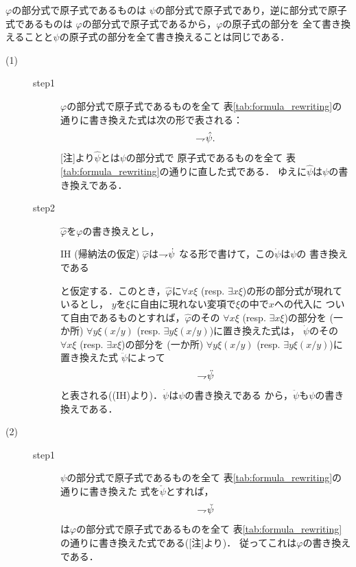 	\begin{metaprf}
		[注] $\varphi$の部分式で原子式であるものは
		$\psi$の部分式で原子式であり，逆に部分式で原子式であるものは
		$\varphi$の部分式で原子式であるから，$\varphi$の原子式の部分を
		全て書き換えることと$\psi$の原子式の部分を全て書き換えることは同じである．
		\begin{description}
			\item[(1)] 
				\begin{description}
					\item[step1]
						$\varphi$の部分式で原子式であるものを全て
						表\ref{tab:formula_rewriting}の通りに書き換えた式は次の形で表される：
						\begin{align}
							\rightharpoondown\hspace{-0.25em} \hat{\psi}.
						\end{align}
						[注]より$\hat{\psi}$とは$\psi$の部分式で
						原子式であるものを全て
						表\ref{tab:formula_rewriting}の通りに直した式である．
						ゆえに$\hat{\psi}$は$\psi$の書き換えである．
						
					\item[step2]
						$\widehat{\varphi}$を$\varphi$の書き換えとし，
						\begin{itembox}[l]{IH (帰納法の仮定)}
							$\widehat{\varphi}$は$\rightharpoondown\hspace{-0.25em} \dot{\psi}$
							なる形で書けて，この$\dot{\psi}$は$\psi$の
							書き換えである
						\end{itembox}
						と仮定する．このとき，$\widehat{\varphi}$に$\forall x \xi$ 
						(resp. $\exists x \xi$)の形の部分式が現れているとし，
						$y$を$\xi$に自由に現れない変項で$\xi$の中で$x$への代入に
						ついて自由であるものとすれば，$\widehat{\varphi}$のその
						$\forall x \xi$ (resp. $\exists x \xi$)の部分を
						(一か所) $\forall y \xi(x/y)$
						(resp. $\exists y \xi(x/y)$)に置き換えた式は，
						$\dot{\psi}$のその$\forall x \xi$
						(resp. $\exists x \xi$)の部分を
						(一か所) $\forall y \xi(x/y)$
						(resp. $\exists y \xi(x/y)$)に置き換えた式
						$\ddot{\psi}$によって
						\begin{align}
							\rightharpoondown\hspace{-0.25em} \ddot{\psi}
						\end{align}
						と表される((IH)より)．$\dot{\psi}$は$\psi$の書き換えである
						から，$\ddot{\psi}$も$\psi$の書き換えである．
				\end{description}
				
			\item[(2)]		
				\begin{description}
					\item[step1]
						$\psi$の部分式で原子式であるものを全て
						表\ref{tab:formula_rewriting}の通りに書き換えた
						式を$\check{\psi}$とすれば，
						\begin{align}
							\rightharpoondown\hspace{-0.25em} \check{\psi}
						\end{align}
						は$\varphi$の部分式で原子式であるものを全て
						表\ref{tab:formula_rewriting}の通りに書き換えた式である([注]より)．
						従ってこれは$\varphi$の書き換えである．
								

\end{description}
\end{description}
\end{metaprf}
